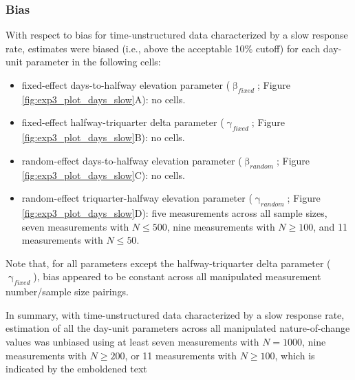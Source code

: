 \documentclass[
12pt, %
twoside,
english]{guelphthesis}
\begin{document}
\hypertarget{bias-slow-exp3}{%
\subsubsection{Bias}\label{bias-slow-exp3}}

With respect to bias for time-unstructured data characterized by a slow response rate, estimates were biased (i.e., above the acceptable 10\% cutoff) for each day-unit parameter in the following cells:
\begin{itemize}
\tightlist
\item
  fixed-effect days-to-halfway elevation parameter (\(\upbeta_{fixed}\); Figure \ref{fig:exp3_plot_days_slow}A): no cells.
\item
  fixed-effect halfway-triquarter delta parameter (\(\upgamma_{fixed}\); Figure \ref{fig:exp3_plot_days_slow}B): no cells.
\item
  random-effect days-to-halfway elevation parameter (\(\upbeta_{random}\); Figure \ref{fig:exp3_plot_days_slow}C): no cells.
\item
  random-effect triquarter-halfway elevation parameter (\(\upgamma_{random}\); Figure \ref{fig:exp3_plot_days_slow}D): five measurements across all sample sizes, seven measurements with \(N \le 500\), nine measurements with \(N \ge 100\), and 11 measurements with \(N \le 50\).
\end{itemize}
\noindent Note that, for all parameters except the halfway-triquarter delta parameter (\(\upgamma_{fixed}\)), bias appeared to be constant across all manipulated measurement number/sample size pairings.

In summary, with time-unstructured data characterized by a slow response rate, estimation of all the day-unit parameters across all manipulated nature-of-change values was unbiased using at least seven measurements with \(N = 1000\), nine measurements with \(N \ge 200\), or 11 measurements with \(N \ge 100\), which is indicated by the emboldened text
\end{document}
